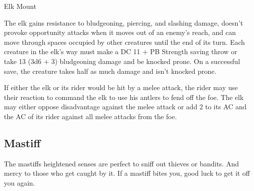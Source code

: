 \documentclass[letterpaper,twocolumn,openany,nodeprecatedcode]{dndbook}
\begin{document}
\begin{DndMonster}[float*=b,width=\textwidth + 8pt]{Elk Mount}
\begin{multicols}{2}
    The elk gains resistance to bludgeoning, piercing, and slashing damage, doesn’t provoke opportunity attacks when it moves out of an enemy’s reach, and can move through spaces occupied by other creatures until the end of its turn. Each creature in the elk’s way must make a DC 11 + PB Strength saving throw or take 13 (3d6 + 3) bludgeoning damage and be knocked prone. On a successful save, the creature takes half as much damage and isn’t knocked prone.


    If either the elk or its rider would be hit by a melee attack, the rider may use their reaction to command the elk to use his antlers to fend off the foe. The elk may either oppose disadvantage against the melee attack or add 2 to its AC and the AC of its rider against all melee attacks from the foe.

  \end{multicols}
\end{DndMonster}

\subsection{Mastiff}
The mastiffs heightened senses are perfect to sniff out thieves or bandits.
And mercy to those who get caught by it.
If a mastiff bites you, good luck to get it off you again.
\end{document}
